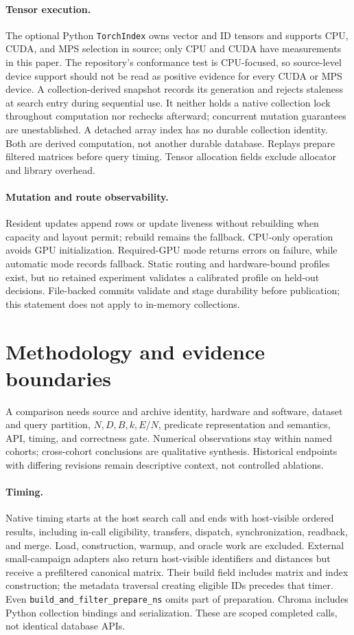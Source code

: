 \documentclass[10pt]{article}
\begin{document}
\paragraph{Tensor execution.}
The optional Python \texttt{TorchIndex} owns vector and ID tensors and supports CPU, CUDA, and MPS selection in source; only CPU and CUDA have measurements in this paper. The repository's conformance test is CPU-focused, so source-level device support should not be read as positive evidence for every CUDA or MPS device. A collection-derived snapshot records its generation and rejects staleness at search entry during sequential use. It neither holds a native collection lock throughout computation nor rechecks afterward; concurrent mutation guarantees are unestablished. A detached array index has no durable collection identity. Both are derived computation, not another durable database. Replays prepare filtered matrices before query timing. Tensor allocation fields exclude allocator and library overhead.

\paragraph{Mutation and route observability.}
Resident updates append rows or update liveness without rebuilding when capacity and layout permit; rebuild remains the fallback. CPU-only operation avoids GPU initialization. Required-GPU mode returns errors on failure, while automatic mode records fallback. Static routing and hardware-bound profiles exist, but no retained experiment validates a calibrated profile on held-out decisions. File-backed commits validate and stage durability before publication; this statement does not apply to in-memory collections.

\section{Methodology and evidence boundaries}
A comparison needs source and archive identity, hardware and software, dataset and query partition, $N,D,B,k,E/N$, predicate representation and semantics, API, timing, and correctness gate. Numerical observations stay within named cohorts; cross-cohort conclusions are qualitative synthesis. Historical endpoints with differing revisions remain descriptive context, not controlled ablations.

\paragraph{Timing.}
Native timing starts at the host search call and ends with host-visible ordered results, including in-call eligibility, transfers, dispatch, synchronization, readback, and merge. Load, construction, warmup, and oracle work are excluded. External small-campaign adapters also return host-visible identifiers and distances but receive a prefiltered canonical matrix. Their build field includes matrix and index construction; the metadata traversal creating eligible IDs precedes that timer. Even \texttt{build\_and\_filter\_prepare\_ns} omits part of preparation. Chroma includes Python collection bindings and serialization. These are scoped completed calls, not identical database APIs.
\end{document}
